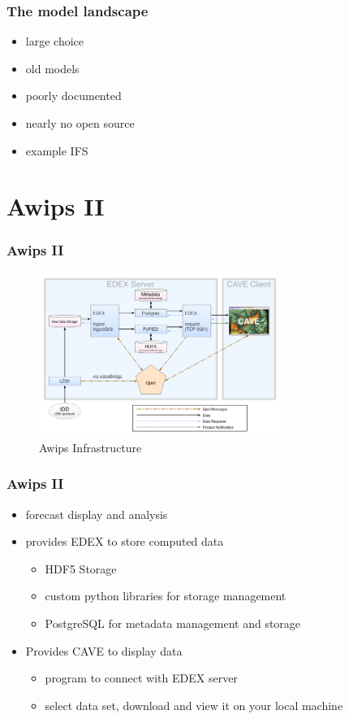 \documentclass[compress]{beamer}
\begin{document}
\begin{frame}
    \frametitle{The model landscape}
	\begin{itemize}
		\item large choice
		\item old models
		\item poorly documented
		\item nearly no open source
		\item example IFS
	\end{itemize}

\end{frame}

\section{Awips II}
\begin{frame}
    \frametitle{Awips II}
    \begin{center}
    	\begin{figure}
			\includegraphics[width=0.7\textwidth]{gfx/awipsII.png}
      	  	\caption[]{Awips Infrastructure \cite{Uni01}}
		\end{figure}
	\end{center}

\end{frame}

\begin{frame}
    \frametitle{Awips II}
    	\begin{itemize}
			\item forecast display and analysis
			\item provides EDEX to store computed data \cite {AwipsDocs}
	    	\begin{itemize}
		    	\item HDF5 Storage
		    	\item custom python libraries for storage management
		    	\item PostgreSQL for metadata management and storage
		    \end{itemize}
		    \item Provides CAVE to display data
	    	\begin{itemize}
		    	\item program to connect with EDEX server
		    	\item select data set, download and view it on your local machine
		    \end{itemize}
		\end{itemize}
\end{frame}
\end{document}
